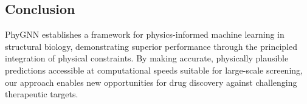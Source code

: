 \subsection*{Conclusion}
PhyGNN establishes a framework for physics-informed machine learning in structural biology, demonstrating superior performance through the principled integration of physical constraints. By making accurate, physically plausible predictions accessible at computational speeds suitable for large-scale screening, our approach enables new opportunities for drug discovery against challenging therapeutic targets.
